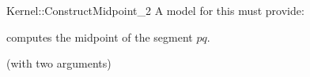 \begin{ccRefFunctionObjectConcept}{Kernel::ConstructMidpoint_2}
A model for this must provide:


 {computes the midpoint of the segment $pq$.}

\ccRefines
{} (with two arguments)

\ccSeeAlso
{}\\

\end{ccRefFunctionObjectConcept}
